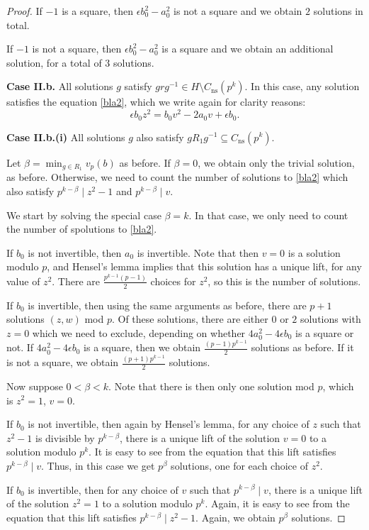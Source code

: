 \documentclass[10pt,a4paper]{amsart}
\begin{document}
\begin{proof}
If $-1$ is a square, then $\epsilon b_0^2-a_0^2$ is not a square and we obtain $2$ solutions in total. 

If $-1$ is not a square, then $\epsilon b_0^2-a_0^2$ is a square and we obtain an additional solution, for a total of $3$ solutions.

\noindent \textbf{Case II.b.} All solutions $g$ satisfy $grg^{-1} \in H\setminus C_{\mathrm{ns}}(p^k)$. In this case, any solution satisfies the equation \eqref{bla2}, which we write again for clarity reasons: $$\epsilon b_0 z^2=b_0 v^2-2a_0v+\epsilon b_0.$$

\noindent \textbf{Case II.b.(i)} All solutions $g$ also satisfy $gR_1g^{-1}\subseteq C_{\mathrm{ns}}(p^k)$. 

Let $\beta=\min_{g \in R_1}v_p(b)$ as before. If $\beta=0$, we obtain only the trivial solution, as before. Otherwise, we need to count the number of solutions to \eqref{bla2} which also satisfy $p^{k-\beta} \mid z^2-1$ and $p^{k-\beta} \mid v$.

We start by solving the special case $\beta=k$. In that case, we only need to count the number of spolutions to \eqref{bla2}. 

If $b_0$ is not invertible, then $a_0$ is invertible. Note that then $v=0$ is a solution modulo $p$, and Hensel's lemma implies that this solution has a unique lift, for any value of $z^2$. There are $\frac{p^{k-1}(p-1)}{2}$ choices for $z^2$, so this is the number of solutions.

If $b_0$ is invertible, then using the same arguments as before, there are $p+1$ solutions $(z,w)$ mod $p$. Of these solutions, there are either $0$ or $2$ solutions with $z=0$ which we need to exclude, depending on whether $4a_0^2-4\epsilon b_0$ is a square or not. If $4a_0^2-4\epsilon b_0$ is a square, then we obtain $\frac{(p-1)p^{k-1}}{2}$ solutions as before. If it is not a square, we obtain $\frac{(p+1)p^{k-1}}{2}$ solutions.

Now suppose $0<\beta<k$. Note that there is then only one solution mod $p$, which is $z^2=1$, $v=0$. 

If $b_0$ is not invertible, then again by Hensel's lemma, for any choice of $z$ such that $z^2-1$ is divisible by $p^{k-\beta}$, there is a unique lift of the solution $v=0$ to a solution modulo $p^k$. It is easy to see from the equation that this lift satisfies $p^{k-\beta} \mid v$. Thus, in this case we get $p^{\beta}$ solutions, one for each choice of $z^2$.

If $b_0$ is invertible, then for any choice of $v$ such that $p^{k-\beta} \mid v$, there is a unique lift of the solution $z^2=1$ to a solution modulo $p^k$. Again, it is easy to see from the equation that this lift satisfies $p^{k-\beta} \mid z^2-1$. Again, we obtain $p^\beta$ solutions.



\end{proof}
\end{document}
